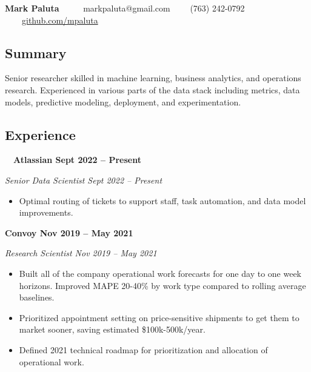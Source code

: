 \documentclass[10pt,letterpaper]{article}
\begin{document}
    \begin{center}
    {\LARGE \textbf{Mark Paluta}} \ \ \ \ \
    markpaluta@gmail.com \ \ \ \ (763) 242-0792 \ \ \ \ \href{https://github.com/mpaluta}{github.com/mpaluta}
    \end{center}

\subsection*{Summary}

    \begin{adjustwidth}{1.25em}{}
        Senior researcher skilled in machine learning, business analytics, and operations research. Experienced in various parts of the data stack including metrics, data models, predictive modeling, deployment, and experimentation.
    \end{adjustwidth}

\subsection*{Experience}

    \quad \ \ \textbf{Atlassian \hfill Sept 2022 – Present}

        \quad \emph{Senior Data Scientist \hfill Sept 2022 – Present}

            \begin{itemize}[label={--}, leftmargin=.5in, labelindent=16pt, topsep=1pt]
                \setlength\itemsep{-.25em}
            	\item Optimal routing of tickets to support staff, task automation, and data model improvements.
            \end{itemize}

    \textbf{Convoy \hfill Nov 2019 – May 2021}

        \quad \emph{Research Scientist \hfill Nov 2019 – May 2021}

            \begin{itemize}[label={--}, leftmargin=.5in, labelindent=16pt, topsep=1pt]
                \setlength\itemsep{-.25em}
            	\item Built all of the company operational work forecasts for one day to one week horizons. Improved MAPE 20-40\% by work type compared to rolling average baselines.
            	\item Prioritized appointment setting on price-sensitive shipments to get them to market sooner, saving estimated \$100k-500k/year.
            	\item Defined 2021 technical roadmap for prioritization and allocation of operational work.
            \end{itemize}
\end{document}
